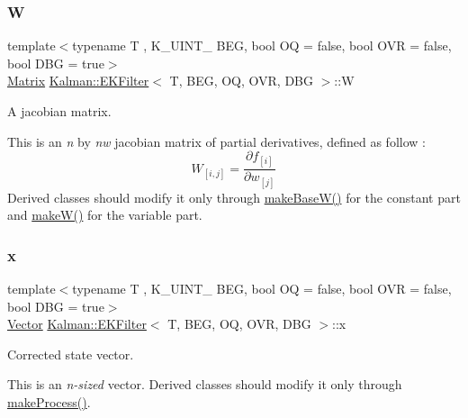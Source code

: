 \subsubsection{\texorpdfstring{W}{W}}
{\footnotesize\ttfamily template$<$typename T , K\+\_\+\+U\+I\+N\+T\+\_ B\+EG, bool OQ = false, bool O\+VR = false, bool D\+BG = true$>$ \\
\mbox{\hyperlink{classKalman_1_1EKFilter_a7cbc4cb4d9139a7f241b27110426af43}{Matrix}} \mbox{\hyperlink{classKalman_1_1EKFilter}{Kalman\+::\+E\+K\+Filter}}$<$ T, B\+EG, OQ, O\+VR, D\+BG $>$\+::W\hspace{0.3cm}{\ttfamily [protected]}}



A jacobian matrix. 

This is an {\itshape n} by {\itshape nw} jacobian matrix of partial derivatives, defined as follow \+: \[ W_{[i,j]} = \frac{\partial f_{[i]}}{\partial w_{[j]}} \] Derived classes should modify it only through {\ttfamily \mbox{\hyperlink{classKalman_1_1EKFilter_a6668b0ffe41e701cc44337546d233465}{make\+Base\+W()}}} for the constant part and {\ttfamily \mbox{\hyperlink{classKalman_1_1EKFilter_ac0ea9285a523d219835f7ca2ce932902}{make\+W()}}} for the variable part. \mbox{\label{classKalman_1_1EKFilter_abc9456e14fd29b7c82ad901ab3e4e63f}} 
\subsubsection{\texorpdfstring{x}{x}}
{\footnotesize\ttfamily template$<$typename T , K\+\_\+\+U\+I\+N\+T\+\_ B\+EG, bool OQ = false, bool O\+VR = false, bool D\+BG = true$>$ \\
\mbox{\hyperlink{classKalman_1_1EKFilter_af773d1217ecb01925b857d49b32bc636}{Vector}} \mbox{\hyperlink{classKalman_1_1EKFilter}{Kalman\+::\+E\+K\+Filter}}$<$ T, B\+EG, OQ, O\+VR, D\+BG $>$\+::x\hspace{0.3cm}{\ttfamily [protected]}}



Corrected state vector. 

This is an {\itshape n-\/sized} vector. Derived classes should modify it only through {\ttfamily \mbox{\hyperlink{classKalman_1_1EKFilter_a778232d397d981c08b3ca23ea800aa6a}{make\+Process()}}}. \mbox{\label{classKalman_1_1EKFilter_a91baacb49f7fae74c449c1d21424f126}} 
